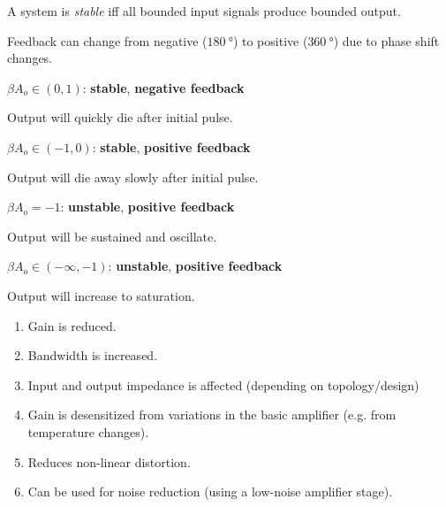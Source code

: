 \begin{multicols}{2}

    \begin{CheatsheetEntryFrame}


        A system is \emph{stable} iff all bounded input signals produce bounded output.

        Feedback can change from negative ($\qty{180}{\degree}$) \linebreak to positive ($\qty{360}{\degree}$) due to phase shift changes.

        $\beta A_o \in (0, 1)$: {\color{mygreen} \textbf{stable}}, {\color{myblue} \textbf{negative feedback}}
        \begin{pindent}
            Output will quickly die after initial pulse.
        \end{pindent}
        $\beta A_o \in (-1, 0)$: {\color{mygreen} \textbf{stable}}, {\color{mypurple} \textbf{positive feedback}}
        \begin{pindent}
            Output will die away slowly after initial pulse.
        \end{pindent}
        $\beta A_o = -1$: {\color{myred} \textbf{unstable}}, {\color{mypurple} \textbf{positive feedback}}
        \begin{pindent}
            Output will be sustained and oscillate.
        \end{pindent}
        $\beta A_o \in (-\infty, -1)$: {\color{myred} \textbf{unstable}}, {\color{mypurple} \textbf{positive feedback}}
        \begin{pindent}
            Output will increase to saturation.
        \end{pindent}

    \end{CheatsheetEntryFrame}

    \begin{CheatsheetEntryFrame}

        \begin{enumerate}
            \item Gain is reduced.
            \item Bandwidth is increased.
            \item Input and output impedance is affected (depending on topology/design)
            \item Gain is desensitized from variations in the basic amplifier (e.g. from temperature changes).
            \item Reduces non-linear distortion.
            \item Can be used for noise reduction (using a low-noise amplifier stage).
        \end{enumerate}

    \end{CheatsheetEntryFrame}

\end{multicols}

